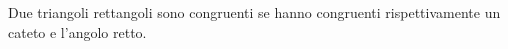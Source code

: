 Due triangoli rettangoli sono congruenti se hanno 
congruenti rispettivamente un cateto e l'angolo retto.